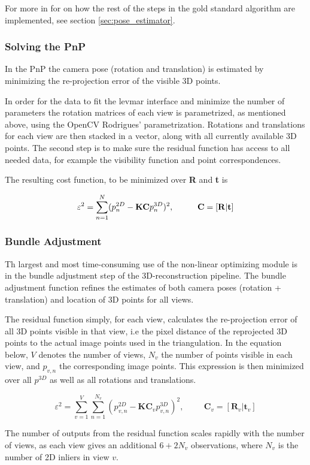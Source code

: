 For more in for on how the rest of the steps in the gold standard algorithm are implemented, see section \ref{sec:pose_estimator}.
\newpage

\subsubsection{Solving the PnP}
In the PnP the camera pose (rotation and translation) is estimated by minimizing the re-projection error of the visible 3D points.

In order for the data to fit the levmar interface and minimize the number of parameters the rotation matrices of each view is parametrized, as mentioned above, using the OpenCV Rodrigues' parametrization. Rotations and translations for each view are then stacked in a vector, along with all currently available 3D points. The second step is to make sure the residual function has access to all needed data, for example the visibility function and point correspondences.

The resulting cost function, to be minimized over \textbf{R} and \textbf{t} is

\begin{equation}
\label{eq:PnP}
\varepsilon^2 = \sum_{n=1}^{N} (p_n^{2D} - \textbf{KC}p_{n}^{3D})^2, \hspace{1cm} \textbf{C} = [\bf{R} | \bf{t}]
\end{equation} 

\subsubsection{Bundle Adjustment}
Th largest and most time-consuming use of the non-linear optimizing module is in the bundle adjustment step of the 3D-reconstruction pipeline. The bundle adjustment function refines the estimates of both camera poses (rotation + translation) and location of 3D points for all views. 

The residual function simply, for each view, calculates the re-projection error of all 3D points visible in that view, i.e the pixel distance of the reprojected 3D points to the actual image points used in the triangulation. In the equation below, $V$ denotes the number of views, $N_v$ the number of points visible in each view, and $p_{v,n}$ the corresponding image points. This expression is then minimized over all $p^{3D}$ as well as all rotations and translations. 

\begin{equation}
\label{eq:BA}
\varepsilon^2 = \sum_{v=1}^{V}\sum_{n=1}^{N_v} (p_{v,n}^{2D} - \textbf{KC}_vp_{v,n}^{3D})^2, \hspace{1cm} \textbf{C}_v = [\textbf{R}_v | \textbf{t}_v]
\end{equation} 


The number of outputs from the residual function scales rapidly with the number of views, as each view gives an additional $ 6 + 2N_v $ observations, where $ N_v $ is the number of 2D inliers in view $v$.
